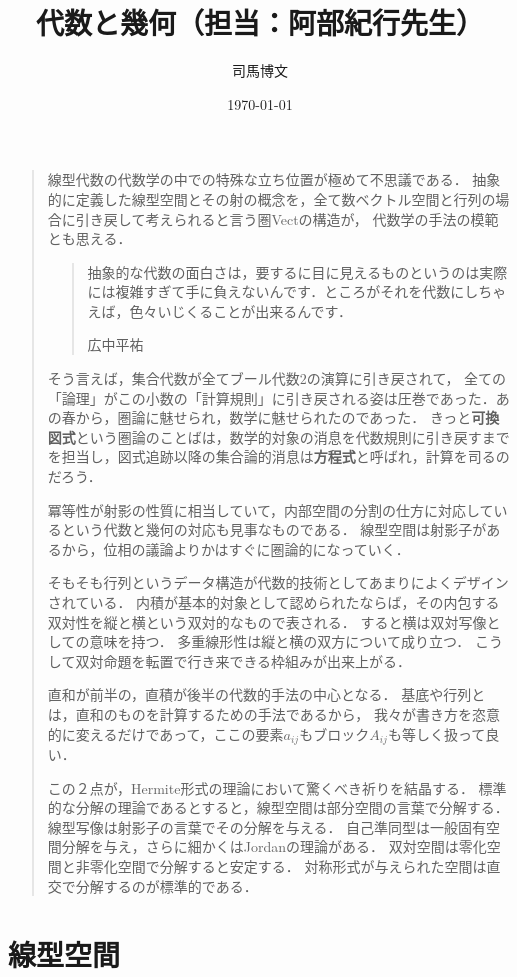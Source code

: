 \documentclass[uplatex, dvipdfmx]{jsreport}
\title{代数と幾何（担当：阿部紀行先生）}
\author{司馬博文}
\date{\today}
\begin{document}
\tableofcontents

\begin{quotation}
    線型代数の代数学の中での特殊な立ち位置が極めて不思議である．
    抽象的に定義した線型空間とその射の概念を，全て数ベクトル空間と行列の場合に引き戻して考えられると言う圏Vectの構造が，
    代数学の手法の模範とも思える．
    \begin{quote}
        抽象的な代数の面白さは，要するに目に見えるものというのは実際には複雑すぎて手に負えないんです．ところがそれを代数にしちゃえば，色々いじくることが出来るんです．
        \begin{flushright}
            広中平祐
        \end{flushright}
    \end{quote}
    そう言えば，集合代数が全てブール代数$2$の演算に引き戻されて，
    全ての「論理」がこの小数の「計算規則」に引き戻される姿は圧巻であった．あの春から，圏論に魅せられ，数学に魅せられたのであった．
    きっと\textbf{可換図式}という圏論のことばは，数学的対象の消息を代数規則に引き戻すまでを担当し，図式追跡以降の集合論的消息は\textbf{方程式}と呼ばれ，計算を司るのだろう．

    冪等性が射影の性質に相当していて，内部空間の分割の仕方に対応しているという代数と幾何の対応も見事なものである．
    線型空間は射影子があるから，位相の議論よりかはすぐに圏論的になっていく．

    そもそも行列というデータ構造が代数的技術としてあまりによくデザインされている．
    内積が基本的対象として認められたならば，その内包する双対性を縦と横という双対的なもので表される．
    すると横は双対写像としての意味を持つ．
    多重線形性は縦と横の双方について成り立つ．
    こうして双対命題を転置で行き来できる枠組みが出来上がる．

    直和が前半の，直積が後半の代数的手法の中心となる．
    基底や行列とは，直和のものを計算するための手法であるから，
    我々が書き方を恣意的に変えるだけであって，ここの要素$a_{ij}$もブロック$A_{ij}$も等しく扱って良い．

    この２点が，Hermite形式の理論において驚くべき祈りを結晶する．
    標準的な分解の理論であるとすると，線型空間は部分空間の言葉で分解する．
    線型写像は射影子の言葉でその分解を与える．
    自己準同型は一般固有空間分解を与え，さらに細かくはJordanの理論がある．
    双対空間は零化空間と非零化空間で分解すると安定する．
    対称形式が与えられた空間は直交で分解するのが標準的である．
\end{quotation}

\chapter{線型空間}
\end{document}
